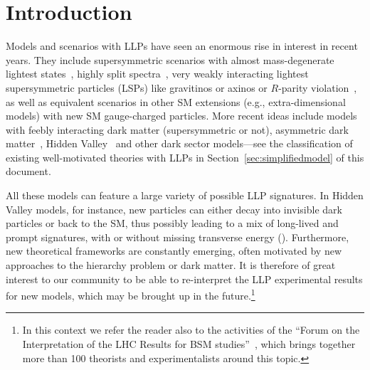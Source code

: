 
\section{Introduction}
\label{sec:ch5-introduction}

Models and scenarios with LLPs have seen an enormous rise in interest in recent years.
They include supersymmetric scenarios with almost mass-degenerate lightest states~\cite{Chen:1995yu,Feng:1999fu}, 
highly split spectra~\cite{ArkaniHamed:2004fb,Giudice:2004tc}, very weakly interacting 
lightest supersymmetric particles (LSPs) like gravitinos or 
axinos \cite{Pagels:1981ke,Covi:1999ty} or $R$-parity violation~\cite{Barbier:2004ez}, 
as well as equivalent scenarios in other SM extensions (e.g., extra-dimensional models) with new SM gauge-charged particles. 
More recent ideas include models with feebly interacting dark matter \cite{Hall:2009bx} (supersymmetric or not), asymmetric dark matter~\cite{Zurek:2013wia}, Hidden Valley~\cite{Strassler:2006im} and other dark sector models---see the classification of existing well-motivated theories with LLPs in Section~\ref{sec:simplifiedmodel} of this document.

All these models can feature a large variety of possible LLP signatures. In Hidden Valley models, for instance,   
new particles can either decay into invisible dark particles or back to the SM, thus possibly leading to a 
mix of long-lived and prompt signatures, with or without missing transverse energy (\MET). 
Furthermore, new theoretical frameworks are constantly emerging, often motivated by 
new approaches to the hierarchy problem or dark matter. 
It is therefore of great interest to our community to be able to 
re-interpret the LLP experimental results 
for new models, which may be brought up in the future.\footnote{In this context we refer the reader also to 
the activities of the ``Forum on the Interpretation of the LHC Results for BSM studies''~\cite{reinterpretationForum}, which brings together more than 100 theorists and experimentalists around this topic.}

